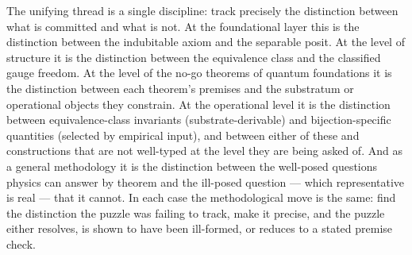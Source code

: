\documentclass[
]{article}
\begin{document}
The unifying thread is a single discipline: track precisely the
distinction between what is committed and what is not. At the
foundational layer this is the distinction between the indubitable axiom
and the separable posit. At the level of structure it is the distinction
between the equivalence class and the classified gauge freedom. At the
level of the no-go theorems of quantum foundations it is the distinction
between each theorem's premises and the substratum or operational
objects they constrain. At the operational level it is the distinction
between equivalence-class invariants (substrate-derivable) and
bijection-specific quantities (selected by empirical input), and between
either of these and constructions that are not well-typed at the level
they are being asked of. And as a general methodology it is the
distinction between the well-posed questions physics can answer by
theorem and the ill-posed question --- which representative is real ---
that it cannot. In each case the methodological move is the same: find
the distinction the puzzle was failing to track, make it precise, and
the puzzle either resolves, is shown to have been ill-formed, or reduces
to a stated premise check.
\end{document}
